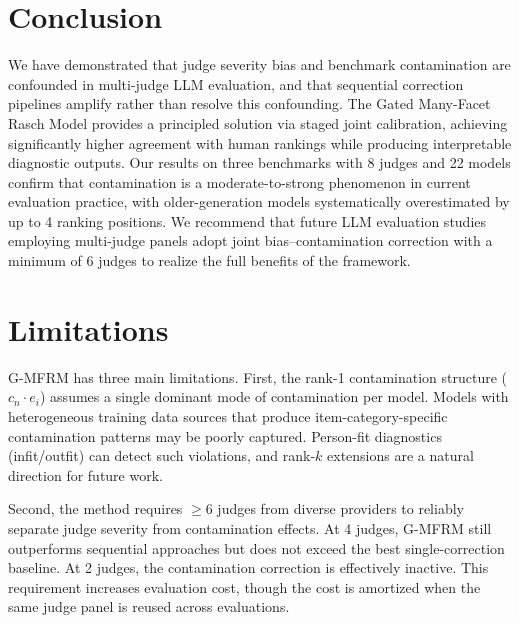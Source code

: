 \documentclass[11pt]{article}
\newcommand{\gmfrm}{\textsc{G-MFRM}}
\newcommand{\ei}{e_i}
\newcommand{\cn}{c_n}
\begin{document}
\section{Conclusion}

We have demonstrated that judge severity bias and benchmark contamination are confounded in multi-judge LLM evaluation, and that sequential correction pipelines amplify rather than resolve this confounding. The Gated Many-Facet Rasch Model provides a principled solution via staged joint calibration, achieving significantly higher agreement with human rankings while producing interpretable diagnostic outputs. Our results on three benchmarks with 8 judges and 22 models confirm that contamination is a moderate-to-strong phenomenon in current evaluation practice, with older-generation models systematically overestimated by up to 4 ranking positions. We recommend that future LLM evaluation studies employing multi-judge panels adopt joint bias--contamination correction with a minimum of 6 judges to realize the full benefits of the framework.

\section*{Limitations}

\gmfrm{} has three main limitations. First, the rank-1 contamination structure ($\cn \cdot \ei$) assumes a single dominant mode of contamination per model. Models with heterogeneous training data sources that produce item-category-specific contamination patterns may be poorly captured. Person-fit diagnostics (infit/outfit) can detect such violations, and rank-$k$ extensions are a natural direction for future work.

Second, the method requires $\geq$6 judges from diverse providers to reliably separate judge severity from contamination effects. At 4 judges, \gmfrm{} still outperforms sequential approaches but does not exceed the best single-correction baseline. At 2 judges, the contamination correction is effectively inactive. This requirement increases evaluation cost, though the cost is amortized when the same judge panel is reused across evaluations.
\end{document}

